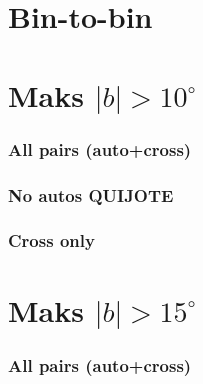 

\clearpage

\section*{Bin-to-bin}
\section{Maks $|b| > 10^{\circ}$}

\subsubsection*{All pairs (auto+cross)}



\clearpage

\subsubsection*{No autos QUIJOTE}



\clearpage

\subsubsection*{Cross only}



\clearpage

\section{Maks $|b| > 15^{\circ}$}

\subsubsection*{All pairs (auto+cross)}



